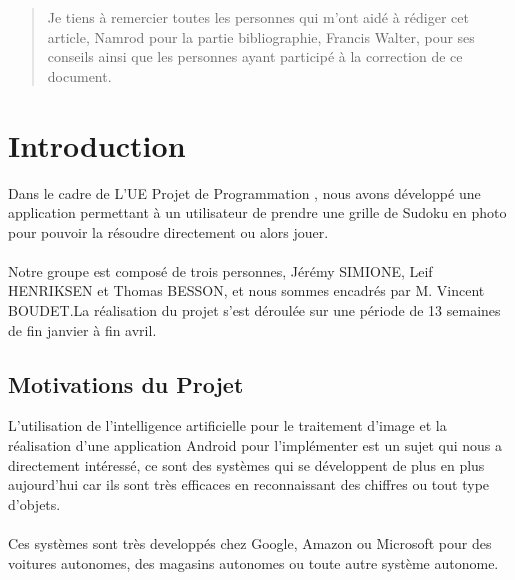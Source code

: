 \documentclass{article}
\begin{document}
\newcommand{\CC}{C\nolinebreak\hspace{-.05em}\raisebox{.4ex}{\tiny\bf +}\nolinebreak\hspace{-.10em}\raisebox{.4ex}{\tiny\bf +}}
\def\CC{{C\nolinebreak[4]\hspace{-.05em}\raisebox{.4ex}{\tiny\bf ++}}}

\newpage
\thispagestyle{empty}
\renewcommand{\abstractname}{Remerciements}
\begin{abstract}
Je tiens à remercier toutes les personnes qui m'ont aidé à rédiger cet article, Namrod pour la partie bibliographie, Francis Walter, pour ses conseils ainsi que les personnes ayant participé à la correction de ce document.
\end{abstract}
\thispagestyle{empty}%

\newpage

\tableofcontents
\newpage
\pagestyle{fancy}
\renewcommand\headrulewidth{1pt}
\section*{Introduction}
Dans le cadre de L'UE Projet de Programmation , nous avons développé une application permettant à un utilisateur de prendre une grille de Sudoku en photo pour pouvoir la résoudre directement ou alors jouer.\\\\
Notre groupe est composé de trois personnes, Jérémy SIMIONE, Leif HENRIKSEN et Thomas BESSON, et nous sommes encadrés par M. Vincent BOUDET.La réalisation du projet s'est déroulée sur une période de 13 semaines de fin janvier à fin avril.


\subsection*{Motivations du Projet}
L'utilisation de l'intelligence artificielle pour le traitement d'image et la réalisation d'une application Android pour l'implémenter est un sujet qui nous a directement intéressé, ce sont des systèmes qui se développent de plus en plus aujourd'hui car ils sont très efficaces en reconnaissant des chiffres ou tout type d'objets.\\\\
Ces systèmes sont très developpés chez Google, Amazon ou Microsoft pour des voitures autonomes, des magasins autonomes ou toute autre système autonome.
\end{document}
